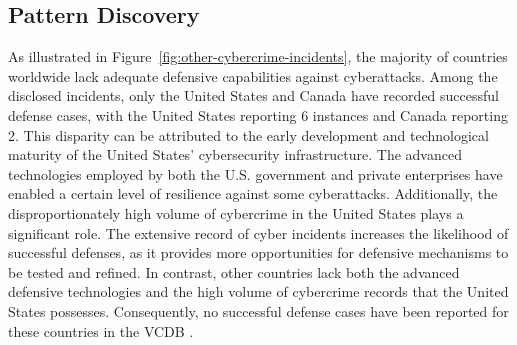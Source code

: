\subsection{Pattern Discovery}\label{subsec:pattern-discovery} %
	As illustrated in Figure~\ref{fig:other-cybercrime-incidents},
	the majority of countries worldwide lack adequate defensive capabilities against cyberattacks.
	Among the disclosed incidents, only the United States and Canada have recorded successful defense cases,
	with the United States reporting 6 instances and Canada reporting 2.
	This disparity can be attributed to the early development and technological maturity of the United States' cybersecurity infrastructure.
	The advanced technologies employed by both the U.S. government and private enterprises have enabled a certain level of resilience against some cyberattacks.
	Additionally, the disproportionately high volume of cybercrime in the United States plays a significant role.
	The extensive record of cyber incidents increases the likelihood of successful defenses,
	as it provides more opportunities for defensive mechanisms to be tested and refined.
	In contrast, other countries lack both the advanced defensive technologies and the high volume of cybercrime records that the United States possesses.
	Consequently, no successful defense cases have been reported for these countries in the VCDB .

